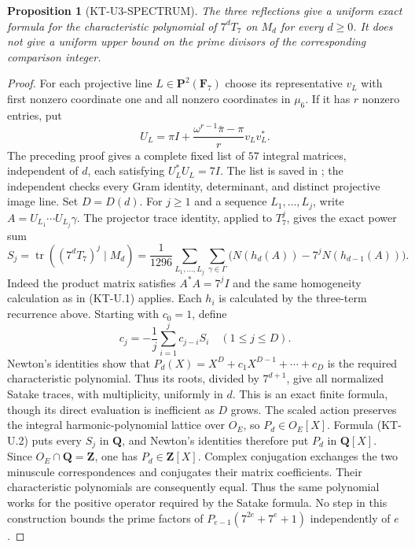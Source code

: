 \documentclass[11pt,a4paper]{article}
\newtheorem{proposition}[theorem]{Proposition}
\theoremstyle{definition}
\begin{document}
\begin{proposition}[KT-U3-SPECTRUM]
The three reflections give a uniform exact formula for the
characteristic polynomial of $7^dT_7$ on $M_d$ for every $d\geq0$.
It does not give a uniform upper bound on the prime divisors of the
corresponding comparison integer.
\end{proposition}
\begin{proof}
For each projective line $L\in\mathbf P^2(\mathbf F_7)$ choose its
representative $v_L$ with first nonzero coordinate one and all
nonzero coordinates in $\mu_6$. If it has $r$ nonzero entries, put
\[
 U_L=\pi I+\frac{\omega^{r-1}\bar\pi-\pi}{r}v_Lv_L^*.
\]
The preceding proof gives a complete fixed list of $57$ integral
matrices, independent of $d$, each satisfying $U_L^*U_L=7I$.
The list is saved in ; the independent
 checks every Gram identity, determinant,
and distinct projective image line.
Set $D=D(d)$. For $j\geq1$ and a sequence $L_1,\ldots,L_j$,
write $A=U_{L_1}\cdots U_{L_j}\gamma$.
The projector trace identity, applied to $T_7^j$, gives the exact
power sum
\[
 S_j=\operatorname{tr}((7^dT_7)^j\mid M_d)
 =\frac1{1296}
   \sum_{L_1,\ldots,L_j}\sum_{\gamma\in\Gamma}
       \bigl(N(h_d(A))-7^jN(h_{d-1}(A))\bigr).       \tag{KT-U.2}
\]
Indeed the product matrix satisfies $A^*A=7^jI$ and the same
homogeneity calculation as in (KT-U.1) applies.
Each $h_i$ is calculated by the three-term recurrence above.
Starting with $c_0=1$, define
\[
           c_j=-\frac1j\sum_{i=1}^j c_{j-i}S_i
           \quad(1\leq j\leq D).
\]
Newton's identities show that
$P_d(X)=X^D+c_1X^{D-1}+\cdots+c_D$ is the required
characteristic polynomial. Thus its roots, divided by $7^{d+1}$,
give all normalized Satake traces, with multiplicity, uniformly
in $d$. This is an exact finite formula, though its direct evaluation
is inefficient as $D$ grows.
The scaled action preserves the integral harmonic-polynomial
lattice over $O_E$, so $P_d\in O_E[X]$.
Formula (KT-U.2) puts every $S_j$ in $\mathbf Q$, and Newton's
identities therefore put $P_d$ in $\mathbf Q[X]$.
Since $O_E\cap\mathbf Q=\mathbf Z$, one has
$P_d\in\mathbf Z[X]$.
Complex conjugation exchanges the two minuscule correspondences
and conjugates their matrix coefficients. Their characteristic
polynomials are consequently equal. Thus the same polynomial
works for the positive operator required by the Satake formula.
No step in this construction bounds the prime factors of
$P_{e-1}(7^{2e}+7^e+1)$ independently of $e$.
\end{proof}
\end{document}
